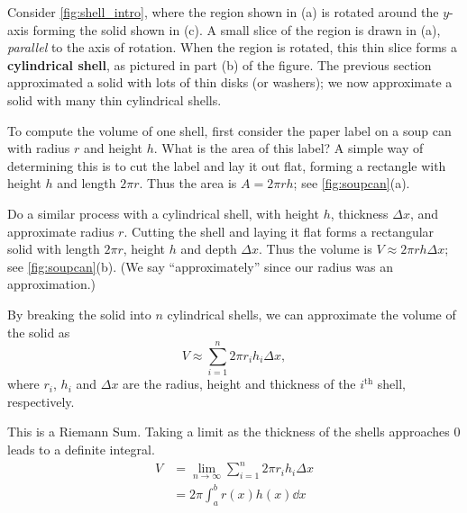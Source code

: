 Consider \autoref{fig:shell_intro}, where the region shown in (a) is rotated around the $y$-axis forming the solid shown in (c). A small slice of the region is drawn in (a), \emph{parallel} to the axis of rotation. When the region is rotated, this thin slice forms a \textbf{cylindrical shell}, as pictured in part (b) of the figure. The previous section approximated a solid with lots of thin disks (or washers); we now approximate a solid with many thin cylindrical shells.

To compute the volume of one shell, first consider the paper label on a soup can with radius $r$ and height $h$. What is the area of this label? A simple way of determining this is to cut the label and lay it out flat, forming a rectangle with height $h$ and length $2\pi r$. Thus the area is $A = 2\pi rh$; see \autoref{fig:soupcan}(a).

Do a similar process with a cylindrical shell, with height $h$, thickness $\Delta x$, and approximate radius $r$. Cutting the shell and laying it flat forms a rectangular solid with length $2\pi r$, height $h$ and depth $\Delta x$. Thus the volume is $V \approx 2\pi rh\Delta x$; see \autoref{fig:soupcan}(b). (We say ``approximately'' since our radius was an approximation.)

By breaking the solid into $n$ cylindrical shells, we can approximate the volume of the solid as
\[V \approx \sum_{i=1}^n 2\pi r_ih_i\Delta x,\]
where $r_i$, $h_i$ and $\Delta x$ are the radius, height and thickness of the $i^{\text{th}}$ shell, respectively. 

This is a Riemann Sum. Taking a limit as the thickness of the shells approaches 0 leads to a definite integral.
\begin{align*}
V&=\lim_{n\to \infty} \sum_{i=1}^n 2\pi r_i h_i \Delta x\\
&=2\pi \int_a^b r(x)h(x)\dd x
\end{align*}

